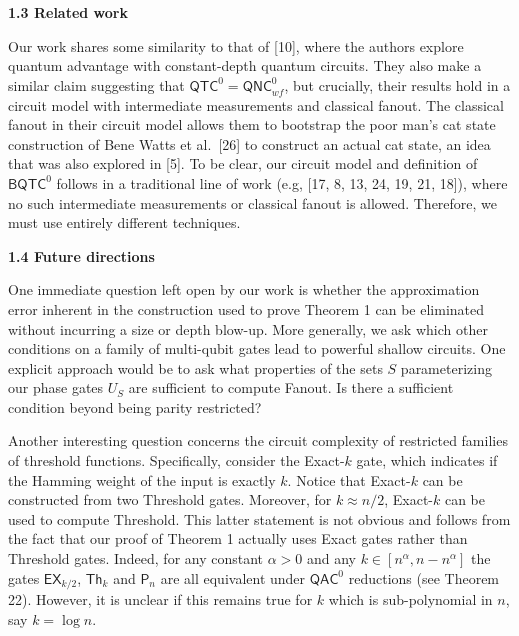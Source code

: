 \documentclass[10pt,a4paper]{article}
\begin{document}
\par\medskip\noindent\textbf{
1.3 Related work}\par




Our work shares some similarity to that of [10], where the authors explore quantum advantage with constant-depth quantum circuits. They also make a similar claim suggesting that ${\mathsf{QTC}}^{0}={\mathsf{QNC}}^{0}_{wf}$, but crucially, their results hold in a circuit model with intermediate measurements and classical fanout. The classical fanout in their circuit model allows them to bootstrap the poor man’s cat state construction of Bene Watts et al. [26] to construct an actual cat state, an idea that was also explored in [5]. To be clear, our circuit model and definition of ${\mathsf{BQTC}}^{0}$ follows in a traditional line of work (e.g, [17, 8, 13, 24, 19, 21, 18]), where no such intermediate measurements or classical fanout is allowed. Therefore, we must use entirely different techniques.\par





\par\medskip\noindent\textbf{
1.4 Future directions}\par




One immediate question left open by our work is whether the approximation error inherent in the construction used to prove Theorem 1 can be eliminated without incurring a size or depth blow-up.
More generally, we ask which other conditions on a family of multi-qubit gates lead to powerful shallow circuits. One explicit approach would be to ask what properties of the sets $S$ parameterizing our phase gates $U_{S}$ are sufficient to compute Fanout. Is there a sufficient condition beyond being parity restricted?\par




Another interesting question concerns the circuit complexity of restricted families of threshold functions. Specifically, consider the Exact-$k$ gate, which indicates if the Hamming weight of the input is exactly $k$. Notice that Exact-$k$ can be constructed from two Threshold gates. Moreover, for $k\approx n/2$, Exact-$k$ can be used to compute Threshold. This latter statement is not obvious and follows from the fact that our proof of Theorem 1 actually uses Exact gates rather than Threshold gates. Indeed, for any constant $\alpha>0$ and any $k\in[n^{\alpha},n-n^{\alpha}]$ the gates $\mathsf{EX}_{k/2}$, $\mathsf{Th}_{k}$ and $\mathsf{P}_{n}$ are all equivalent under ${\mathsf{QAC}}^{0}$ reductions (see Theorem 22). However, it is unclear if this remains true for $k$ which is sub-polynomial in $n$, say $k=\log{n}$.\par
\end{document}
